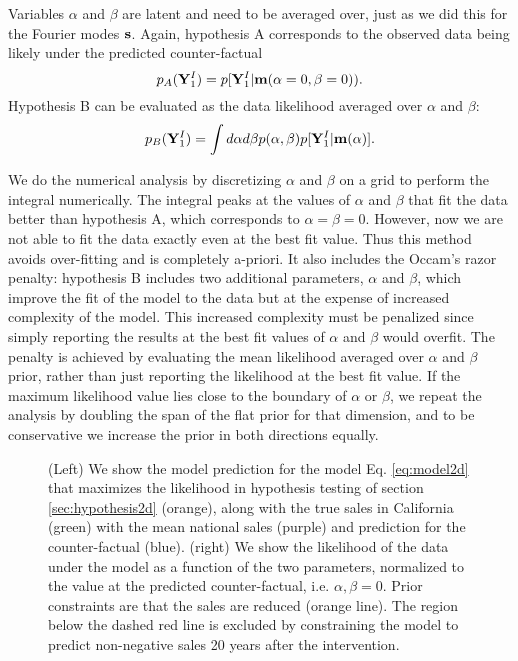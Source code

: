 \documentclass{article}
\def\bm{{\bf m}}
\def\bY{{\bf Y}}
\def\bs{{\bf s}}
\begin{document}
Variables $\alpha$ and $\beta$ are latent and need to be averaged over, just as we did this for the Fourier modes $\bs$.
Again, hypothesis A corresponds to the observed data being likely under the predicted counter-factual 
\begin{equation}
p_A(\bY^I_{1})=p[\bY^I_{1}|\bm(\alpha=0,\beta=0)).
\end{equation}
Hypothesis B can be evaluated as the data likelihood averaged over $\alpha$ and $\beta$: 
\begin{equation}
    p_B(\bY^I_{1})=\int d\alpha d\beta p(\alpha,\beta) p[\bY^I_{1}|\bm(\alpha)]. 
    \label{eq:marginalpB}
\end{equation}

We do the numerical analysis by discretizing $\alpha$ and $\beta$ on a grid to perform the integral numerically.
The integral peaks at the values of $\alpha$ and $\beta$ that fit the data better than hypothesis A, which corresponds to $\alpha=\beta=0$. 
However, now we are not able to fit the data exactly even at the best fit value. Thus this method avoids over-fitting and is completely a-priori. 
It also includes the Occam's razor penalty: 
hypothesis B includes two additional parameters, $\alpha$ and $\beta$, which improve 
the fit of the model to the data but at the expense of increased complexity of the model. This increased complexity
must be penalized since simply reporting the results at the best fit values of $\alpha$ and $\beta$ would overfit. 
The penalty is achieved by evaluating the mean likelihood averaged over $\alpha$ and $\beta$
prior, rather than just reporting the likelihood at the best fit value.
If the maximum likelihood value lies close to the boundary of $\alpha$ or $\beta$,
we repeat the analysis by doubling the span of the flat prior for that dimension, and to be conservative we increase the prior
in both directions equally.


\begin{figure}
    \centering
    \caption{(Left) We show the model prediction for the model Eq. \ref{eq:model2d} that maximizes the likelihood in hypothesis testing of section \ref{sec:hypothesis2d} (orange), along with the true sales in California (green) with the mean national sales (purple) and prediction for the counter-factual (blue). (right) We show the likelihood of the data under the model as a function of the two parameters, normalized to the value at the predicted counter-factual, i.e. $\alpha, \beta=0$. Prior constraints are 
    that the sales are reduced (orange line). The region below the dashed red line is excluded by constraining the model to predict non-negative sales 20 years after the intervention.}
\label{fig:hypothesis2d}
\end{figure}
\end{document}
